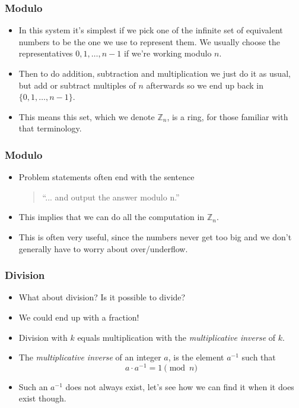 \documentclass{beamer}
\begin{document}
\begin{frame}
  \frametitle{Modulo}
  \begin{itemize}
  \item In this system it's simplest if we pick one of the infinite set of equivalent numbers to be the one we use to represent them. We usually choose the representatives $0, 1, \dots, n - 1$ if we're working modulo $n$.
  \item<2-> Then to do addition, subtraction and multiplication we just do it as usual, but add or subtract multiples of $n$ afterwards so we end up back in $\{0, 1, \dots, n - 1\}$.
  \item<3-> This means this set, which we denote $\mathbb{Z}_n$, is a ring, for those familiar with that terminology.
  \end{itemize}
\end{frame}

\begin{frame}
  \frametitle{Modulo}
  \vspace{30pt}
  \begin{itemize}
    \item Problem statements often end with the sentence \\
      \vspace{10pt}
      \begin{quote}
``... and output the answer modulo n.''
      \end{quote}
      \vspace{10pt}
    \item This implies that we can do all the computation in $\mathbb{Z}_n$.
    \item This is often very useful, since the numbers never get too big and we don't generally have to worry about over/underflow.
  \end{itemize}
\end{frame}

\begin{frame}[plain]
  \frametitle{Division}
  \vspace{30pt}
  \begin{itemize}
    \item What about division? Is it possible to divide? 
    \item We could end up with a fraction!
    \item Division with $k$ equals multiplication with the \emph{multiplicative
      inverse} of $k$.
    \item The \emph{multiplicative inverse} of an integer $a$, is the element $a^{-1}$ such that
      \[
        a \cdot a^{-1} = 1 \pmod{n}
      \]
   \item<5-> Such an $a^{-1}$ does not always exist, let's see how we can find it when it does exist though.
  \end{itemize}
\end{frame}
\end{document}
